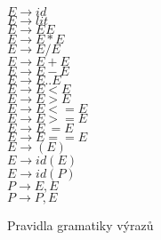 \begin{figure}
$ E \rightarrow id $ \\
$ E \rightarrow	lit $ \\
$ E \rightarrow E ^{} E $ \\
$ E \rightarrow	E * E $ \\
$ E \rightarrow	E / E $ \\
$ E \rightarrow E + E $ \\
$ E \rightarrow	E - E $ \\
$ E \rightarrow	E .. E $ \\
$ E \rightarrow	E < E $ \\
$ E \rightarrow	E > E $ \\
$ E \rightarrow	E <= E $ \\
$ E \rightarrow	E >= E $ \\
$ E \rightarrow	E ~= E $ \\
$ E \rightarrow	E == E $ \\
$ E \rightarrow	( E ) $ \\
$ E \rightarrow	id ( E ) $ \\
$ E \rightarrow	id ( P ) $ \\
$ P \rightarrow E, E $ \\
$ P \rightarrow	P, E $ \\
\caption{Pravidla gramatiky výrazů}
\label{syn.expr}
\end{figure}
